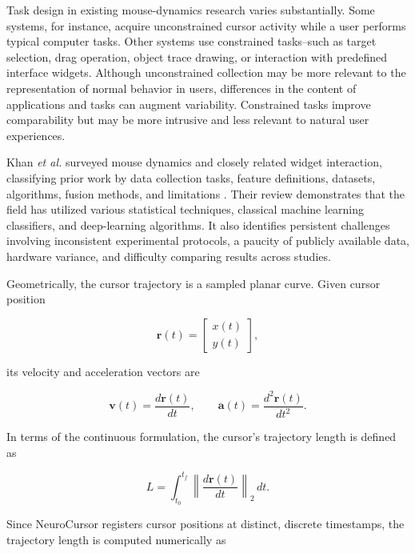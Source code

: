 \documentclass[conference]{IEEEtran}
\begin{document}
Task design in existing mouse-dynamics research varies substantially. Some systems, for instance, acquire unconstrained cursor activity while a user performs typical computer tasks. Other systems use constrained tasks--such as target selection, drag operation, object trace drawing, or interaction with predefined interface widgets. Although unconstrained collection may be more relevant to the representation of normal behavior in users, differences in the content of applications and tasks can augment variability. Constrained tasks improve comparability but may be more intrusive and less relevant to natural user experiences. 

Khan \textit{et al.} surveyed mouse dynamics and closely related widget interaction, classifying prior work by data collection tasks, feature definitions, datasets, algorithms, fusion methods, and limitations \cite{khanMouseSurvey}. Their review demonstrates that the field has utilized various statistical techniques, classical machine learning classifiers, and deep-learning algorithms. It also identifies persistent challenges involving inconsistent experimental protocols, a paucity of publicly available data, hardware variance, and difficulty comparing results across studies. 

Geometrically, the cursor trajectory is a sampled planar curve. Given cursor position 

\begin{equation}
\mathbf{r}(t)
=
\begin{bmatrix}
x(t)\\
y(t)
\end{bmatrix},
\end{equation}

its velocity and acceleration vectors are 

\begin{equation}
\mathbf{v}(t)
=
\frac{d\mathbf{r}(t)}{dt},
\qquad
\mathbf{a}(t)
=
\frac{d^2\mathbf{r}(t)}{dt^2}.
\end{equation}

In terms of the continuous formulation, the cursor's trajectory length is defined as

\begin{equation}
L
=
\int_{t_0}^{t_f}
\left\|
\frac{d\mathbf{r}(t)}{dt}
\right\|_2
\,dt.
\label{eq:continuous_path_length}
\end{equation}

Since NeuroCursor registers cursor positions at distinct, discrete timestamps, the trajectory length is computed numerically as 
\end{document}

